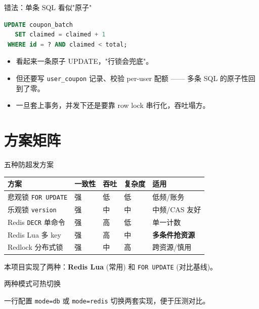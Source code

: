 \begin{frame}[fragile]{错法：单条 SQL 看似"原子"}
\begin{lstlisting}[language=SQL,basicstyle=\ttfamily\scriptsize]
UPDATE coupon_batch
   SET claimed = claimed + 1
 WHERE id = ? AND claimed < total;
\end{lstlisting}
\begin{itemize}
  \item 看起来一条原子 UPDATE，"行锁会兜底"。
  \item 但还要写 \texttt{user\_coupon} 记录、校验 per-user 配额 —— 多条 SQL 的原子性回到了零。
  \item 一旦套上事务，并发下还是要靠 row lock 串行化，吞吐塌方。
\end{itemize}
\end{frame}

\section{方案矩阵}

\begin{frame}{五种防超发方案}
\begin{tabular}{@{}lllll@{}}
\toprule
方案 & 一致性 & 吞吐 & 复杂度 & 适用 \\
\midrule
悲观锁 \texttt{FOR UPDATE} & 强 & 低 & 低 & 低频/账务 \\
乐观锁 \texttt{version} & 强 & 中 & 中 & 中频/CAS 友好 \\
Redis \texttt{DECR} 单命令 & 强 & 高 & 低 & 单一计数 \\
Redis Lua 多 key & 强 & 高 & 中 & \textbf{多条件抢资源} \\
Redlock 分布式锁 & 强 & 中 & 高 & 跨资源/慎用 \\
\bottomrule
\end{tabular}
\vspace{3mm}
\small 本项目实现了两种：\textbf{Redis Lua} (常用) 和 \texttt{FOR UPDATE} (对比基线)。
\end{frame}

\begin{frame}{两种模式可热切换}
\vspace{1mm}
\small 一行配置 \texttt{mode=db} 或 \texttt{mode=redis} 切换两套实现，便于压测对比。
\end{frame}

